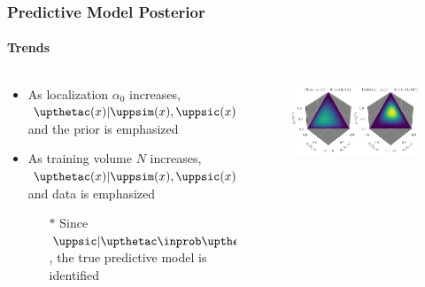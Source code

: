 \documentclass[aspectratio=169]{beamer}
\begin{document}
\begin{frame}
\frametitle{Predictive Model Posterior}
\framesubtitle{Trends}

\begin{columns}[c]

\begin{column}{.5\linewidth}

\begin{itemize}
\item As localization $\alpha_0$ increases, $\upthetac(x) | \uppsim(x),\uppsic(x) \inprob  \alphac(x)$ and the prior is emphasized
\vspace{1em}
\item As training volume $N$ increases, $\upthetac(x) | \uppsim(x),\uppsic(x) \inprob \uppsic(x)$ and data is emphasized
\begin{itemize}
\item[$*$] Since $\uppsic | \upthetac \inprob \upthetac$, the true predictive model is \alert{identified}
\end{itemize}
\end{itemize}


\end{column}

\begin{column}{.5\linewidth}

\begin{figure}
\centering
\includegraphics[width=1\linewidth]{SSP_2021/presentation/prior_post_h.png}
\label{fig:P_theta_post_uni}
\end{figure}

\end{column}

\end{columns}


\vspace{1em}

\centering
{}

\end{frame}
\end{document}
